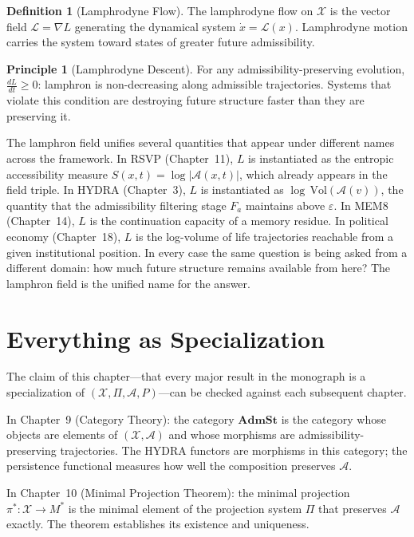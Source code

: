 \documentclass[12pt, oneside]{book}
\theoremstyle{flyxion}
\theoremstyle{definition}
\newtheorem{definition}[theorem]{Definition}
\newtheorem{principle}[theorem]{Principle}
\begin{document}
\begin{definition}[Lamphrodyne Flow]
\label{def:lamphrodyne}
The lamphrodyne flow on $\mathcal{X}$ is the vector field
$\mathcal{L} = \nabla L$ generating the dynamical system
$\dot{x} = \mathcal{L}(x)$. Lamphrodyne motion carries the
system toward states of greater future admissibility.
\end{definition}

\begin{principle}[Lamphrodyne Descent]
\label{prin:lamphrodyne}
For any admissibility-preserving evolution,
$\frac{dL}{dt} \geq 0$: lamphron is non-decreasing along
admissible trajectories. Systems that violate this condition
are destroying future structure faster than they are
preserving it.
\end{principle}

The lamphron field unifies several quantities that appear under
different names across the framework. In RSVP (Chapter~11), $L$
is instantiated as the entropic accessibility measure
$S(x,t) = \log|\mathcal{A}(x,t)|$, which already appears in the
field triple. In HYDRA (Chapter~3), $L$ is instantiated as
$\log\,\mathrm{Vol}(\mathcal{A}(v))$, the quantity that the
admissibility filtering stage $F_a$ maintains above $\varepsilon$.
In MEM\textbar{}8 (Chapter~14), $L$ is the continuation capacity
of a memory residue. In political economy (Chapter~18), $L$ is the
log-volume of life trajectories reachable from a given institutional
position. In every case the same question is being asked from a
different domain: how much future structure remains available from
here? The lamphron field is the unified name for the answer.

\section{Everything as Specialization}

The claim of this chapter---that every major result in the
monograph is a specialization of $(\mathcal{X}, \Pi,
\mathcal{A}, P)$---can be checked against each subsequent
chapter.

In Chapter~9 (Category Theory): the category $\mathbf{AdmSt}$
is the category whose objects are elements of
$(\mathcal{X}, \mathcal{A})$ and whose morphisms are
admissibility-preserving trajectories. The HYDRA functors
are morphisms in this category; the persistence functional
measures how well the composition preserves $\mathcal{A}$.

In Chapter~10 (Minimal Projection Theorem): the minimal
projection $\pi^* : \mathcal{X} \to M^*$ is the minimal
element of the projection system $\Pi$ that preserves
$\mathcal{A}$ exactly. The theorem establishes its existence
and uniqueness.
\end{document}
